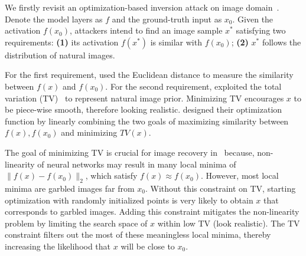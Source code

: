 


We firstly revisit an optimization-based inversion attack on image domain~\cite{he2019model}. Denote the model layers as $f$ and the ground-truth input as $x_0$. Given the activation $f(x_0)$, attackers intend to find an image sample $x^*$ satisfying two requirements: \textbf{(1)} its activation $f(x^*)$ is similar with $f(x_0)$; \textbf{(2)} $x^*$ follows the distribution of natural images.


For the first requirement, \cite{he2019model} used the Euclidean distance to measure the similarity between $f(x)$ and $f(x_0)$. For the second requirement, \cite{he2019model} exploited the total variation (TV)~\cite{rudin1992nonlinear} to represent natural image prior. 
Minimizing TV encourages  $x$ to be piece-wise smooth, therefore looking realistic. \cite{he2019model} designed their optimization function by linearly combining the two goals of maximizing similarity between $f(x),f(x_0)$ and minimizing $TV(x)$. 

The goal of minimizing TV is crucial for image recovery in~\cite{he2019model} because, non-linearity of neural networks may result in many local minima of $\|f(x)-f(x_0)\|_2$, which satisfy $f(x)\approx f(x_0)$. However, most local minima are garbled images far from $x_0$. Without this constraint on TV, 
starting optimization with randomly initialized points is very likely to obtain $x$ that corresponds to garbled images.  Adding this constraint mitigates the non-linearity problem by limiting the search space of $x$ within low TV (look realistic). The TV constraint filters out the most of these meaningless local minima, thereby increasing the likelihood that  $x$ will be close to $x_0$. 




